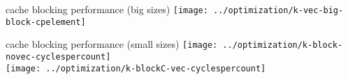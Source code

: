\begin{frame}{cache blocking performance (big sizes)}
\texttt{[image: ../optimization/k-vec-big-block-cpelement]}
\end{frame}

\begin{frame}{cache blocking performance (small sizes)}
\vspace{-.5cm}
\texttt{[image: ../optimization/k-block-novec-cyclespercount]} \\
\texttt{[image: ../optimization/k-blockC-vec-cyclespercount]}
\end{frame}
